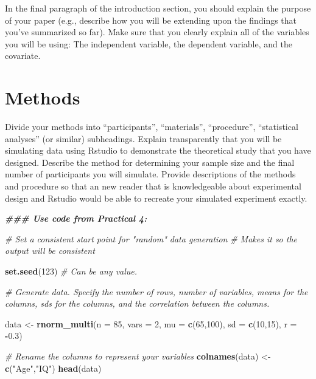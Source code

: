 \documentclass[
]{book}
\newenvironment{Shaded}{\begin{snugshade}}{\end{snugshade}}
\newcommand{\AttributeTok}[1]{\textcolor[rgb]{0.13,0.29,0.53}{#1}}
\newcommand{\CommentTok}[1]{\textcolor[rgb]{0.56,0.35,0.01}{\textit{#1}}}
\newcommand{\DecValTok}[1]{\textcolor[rgb]{0.00,0.00,0.81}{#1}}
\newcommand{\DocumentationTok}[1]{\textcolor[rgb]{0.56,0.35,0.01}{\textbf{\textit{#1}}}}
\newcommand{\FloatTok}[1]{\textcolor[rgb]{0.00,0.00,0.81}{#1}}
\newcommand{\FunctionTok}[1]{\textcolor[rgb]{0.13,0.29,0.53}{\textbf{#1}}}
\newcommand{\NormalTok}[1]{#1}
\newcommand{\OtherTok}[1]{\textcolor[rgb]{0.56,0.35,0.01}{#1}}
\newcommand{\SpecialCharTok}[1]{\textcolor[rgb]{0.81,0.36,0.00}{\textbf{#1}}}
\newcommand{\StringTok}[1]{\textcolor[rgb]{0.31,0.60,0.02}{#1}}
\begin{document}
In the final paragraph of the introduction section, you should explain the purpose of your paper (e.g., describe how you will be extending upon the findings that you've summarized so far). Make sure that you clearly explain all of the variables you will be using: The independent variable, the dependent variable, and the covariate.

\section*{Methods}\label{methods}

Divide your methods into ``participants'', ``materials'', ``procedure'', ``statistical analyses'' (or similar) subheadings. Explain transparently that you will be simulating data using Rstudio to demonstrate the theoretical study that you have designed. Describe the method for determining your sample size and the final number of participants you will simulate. Provide descriptions of the methods and procedure so that an new reader that is knowledgeable about experimental design and Rstudio would be able to recreate your simulated experiment exactly.

\begin{Shaded}
\begin{Highlighting}[]
\DocumentationTok{\#\#\# Use code from Practical 4: }

\CommentTok{\# Set a consistent start point for "random" data generation}
\CommentTok{\# Makes it so the output will be consistent}

\FunctionTok{set.seed}\NormalTok{(}\DecValTok{123}\NormalTok{) }\CommentTok{\# Can be any value. }

\CommentTok{\# Generate data. Specify the number of rows, number of variables, means for the columns, sd\textquotesingle{}s for the columns, and the correlation between the columns.}

\NormalTok{data }\OtherTok{\textless{}{-}} \FunctionTok{rnorm\_multi}\NormalTok{(}\AttributeTok{n =} \DecValTok{85}\NormalTok{, }\AttributeTok{vars =} \DecValTok{2}\NormalTok{, }\AttributeTok{mu =} \FunctionTok{c}\NormalTok{(}\DecValTok{65}\NormalTok{,}\DecValTok{100}\NormalTok{), }\AttributeTok{sd =} \FunctionTok{c}\NormalTok{(}\DecValTok{10}\NormalTok{,}\DecValTok{15}\NormalTok{), }\AttributeTok{r =} \SpecialCharTok{{-}}\FloatTok{0.3}\NormalTok{)}

\CommentTok{\# Rename the columns to represent your variables }
\FunctionTok{colnames}\NormalTok{(data) }\OtherTok{\textless{}{-}} \FunctionTok{c}\NormalTok{(}\StringTok{"Age"}\NormalTok{,}\StringTok{"IQ"}\NormalTok{)}
\FunctionTok{head}\NormalTok{(data)}
\end{Highlighting}
\end{Shaded}
\end{document}
